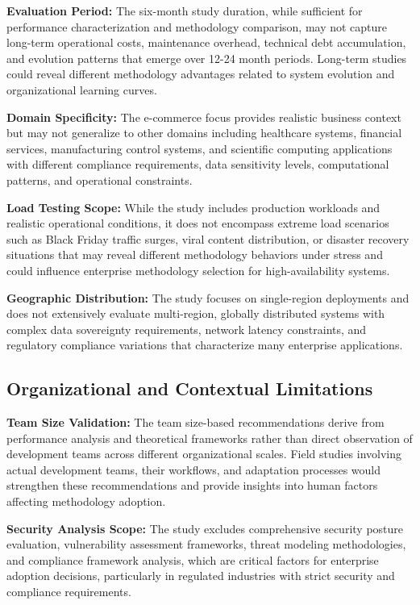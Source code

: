 \textbf{Evaluation Period:} The six-month study duration, while sufficient for performance characterization and methodology comparison, may not capture long-term operational costs, maintenance overhead, technical debt accumulation, and evolution patterns that emerge over 12-24 month periods. Long-term studies could reveal different methodology advantages related to system evolution and organizational learning curves.

\textbf{Domain Specificity:} The e-commerce focus provides realistic business context but may not generalize to other domains including healthcare systems, financial services, manufacturing control systems, and scientific computing applications with different compliance requirements, data sensitivity levels, computational patterns, and operational constraints.

\textbf{Load Testing Scope:} While the study includes production workloads and realistic operational conditions, it does not encompass extreme load scenarios such as Black Friday traffic surges, viral content distribution, or disaster recovery situations that may reveal different methodology behaviors under stress and could influence enterprise methodology selection for high-availability systems.

\textbf{Geographic Distribution:} The study focuses on single-region deployments and does not extensively evaluate multi-region, globally distributed systems with complex data sovereignty requirements, network latency constraints, and regulatory compliance variations that characterize many enterprise applications.

\subsection{Organizational and Contextual Limitations}
\label{subsec:organizational_limitations}

\textbf{Team Size Validation:} The team size-based recommendations derive from performance analysis and theoretical frameworks rather than direct observation of development teams across different organizational scales. Field studies involving actual development teams, their workflows, and adaptation processes would strengthen these recommendations and provide insights into human factors affecting methodology adoption.

\textbf{Security Analysis Scope:} The study excludes comprehensive security posture evaluation, vulnerability assessment frameworks, threat modeling methodologies, and compliance framework analysis, which are critical factors for enterprise adoption decisions, particularly in regulated industries with strict security and compliance requirements.

